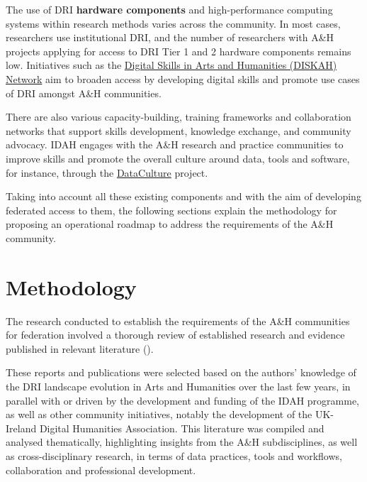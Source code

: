 \documentclass[11pt]{scrartcl}
\begin{document}
The use of DRI \textbf{hardware components} and high-performance computing systems within research methods varies across the community. In most cases, researchers use institutional DRI, and the number of researchers with A\&H projects applying for access to DRI Tier 1 and 2 hardware components remains low. Initiatives such as the \href{https://www.diskah.org/}{Digital Skills in Arts and Humanities (DISKAH) Network} aim to broaden access by developing digital skills and promote use cases of DRI amongst A\&H communities.


There are also various capacity-building, training frameworks and collaboration networks that support skills development, knowledge exchange, and community advocacy. IDAH engages with the A\&H
research and practice communities to improve skills and promote the overall culture around data, tools and software, for instance, through the \href{https://www.turing.ac.uk/research/research-projects/dataculture-building-sustainable-communities-around-arts-and-humanities}{DataCulture} project.  

Taking into account all these existing components and with the aim of developing federated access to them, the following sections explain the methodology for proposing an operational roadmap to address the requirements of the A\&H community.

\section{Methodology}

The research conducted to establish the requirements of the A\&H
communities for federation involved a thorough review of established research and evidence published in relevant literature (\cite{beavan_2025a_15083396,beavan_2025b_15083632,bell_2025_17099176,Black19102024,connected,collier25,de_roure_2022_4716148,evans23,hawkins_2024_14006955,shoaib_sufi_2023_7686348,ross_2024_13710266,romanova_2021_5105938,Rodriguez22,wrro203045,Zwiggelaar22,taylor_2022_10518740,sichani_2023_8177926,McGillivray2020}). 

These reports and publications were selected based on the authors' knowledge of the DRI landscape evolution in Arts and Humanities over the last few years, in parallel with or driven by the development and funding of the IDAH programme, as well as other community initiatives, notably the development of the UK-Ireland Digital Humanities Association. This literature was compiled and analysed thematically, highlighting insights from the A\&H subdisciplines, as well as cross-disciplinary research, in terms of data practices, tools and workflows, collaboration and professional
development. 
\end{document}
